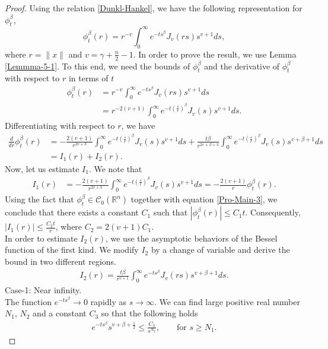 \documentclass[11pt,a4paper,reqno]{amsproc}
\theoremstyle{definition}
\theoremstyle{remark}
\numberwithin{equation}{section}
\begin{document}
\begin{proof}
Using the relation \eqref{Dunkl-Hankel}, we have the following representation for $\phi_t^\beta$,
$$\phi_t^\beta(r)=  
    r^{-v} \int_0^\infty e^{-ts^\beta}J_v(rs)s^{v+1}ds,$$ where $r=\|x\|$ and $v=\gamma+\frac{n}{2}-1.$ In order to prove the result, we use Lemma \ref{Lemmma-5-1}. To this end, we need the bounds of $\phi_t^\beta$ and the derivative of  $\phi_t^\beta$ with respect to $r$ in terms of $t$ 
    \begin{align*}
        \phi_t^\beta(r) &=  r^{-v} \int_0^\infty e^{-ts^\beta}J_v(rs)s^{v+1}ds\\
        & = r^{-2(v+1)}\int_0^\infty e^{-t(\frac{s}{r})^\beta}J_v(s)s^{v+1}ds.
    \end{align*} Differentiating with respect to $r$, we have 
    \begin{align*}
        \frac{d}{dr}\phi_t^\beta(r) &= -
        \frac{2(v+1)}{r^{2v+3}}\int_0^\infty e^{-t(\frac{s}{r})^\beta}J_v(s)s^{v+1}ds + \frac{t\beta}{r^{2v+\beta+3}}\int_0^\infty e^{-t(\frac{s}{r})^\beta}J_v(s)s^{v+\beta+1}ds \\
        & = I_1(r)+I_2(r).
    \end{align*}
    Now, let us estimate $I_1$. We note that 
    \begin{align*}
        I_1(r) &= -\frac{2(v+1)}{r^{2v+3}}\int_0^\infty e^{-t(\frac{s}{r})^\beta}J_v(s)s^{v+1}ds 
         = -\frac{2(v+1)}{r} \phi_t^\beta(r).
    \end{align*} 
Using the fact that $\phi_t^\beta \in \mathcal{C}_0(\mathbb{R}^n)$ together with equation \eqref{Pro-Main-3}, we conclude that there exists a constant $C_1$  such that $|\phi_t^\beta(r)|\leq C_1t$. Consequently, $|I_1(r)| \leq \frac{C_2t}{r}$, where $C_2=2(v+1)C_1.$ \\
In order to estimate $I_2(r)$, we use the asymptotic behaviors of the Bessel function of the first kind. We modify $I_2$ by a change of variable and derive the bound in two different regions.
\begin{align} \label{I2-1}
    I_2(r)= \frac{t\beta}{r^{v+1}} \int_0^\infty e^{-ts^\beta} J_v(rs)s^{v+\beta+1}ds.
\end{align}
Case-1: Near infinity.\\
The function $e^{-ts^\beta} \rightarrow 0$ rapidly as $s \longrightarrow \infty$. We can find large positive real number $N_1$, $ N_2$ and a constant $C_3$ so that the following holds 
\begin{align*}
    e^{-ts^\beta}s^{v+\beta+\frac{1}{2}} \leq \frac{C_3}{s^{N_2}}, \quad \quad \text{for } s\geq N_1.

\end{align*}
\end{proof}
\end{document}
